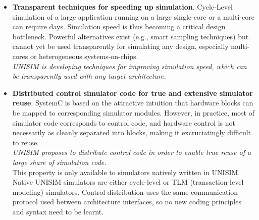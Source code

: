 \begin{itemize}
\item \textbf{Transparent techniques for speeding up simulation}. Cycle-Level simulation of a large application running on a large single-core or a multi-core can require days. Simulation speed is thus becoming a critical design bottleneck. Powerful alternatives exist (e.g., smart sampling techniques) but cannot yet be used transparently for simulating any design, especially multi-cores or heterogeneous systems-on-chips.\\
\emph{UNISIM is developing techniques for improving simulation speed, which can be transparently used with any target architecture.}
\item \textbf{Distributed control simulator code for true and extensive simulator reuse}. SystemC is based on the attractive intuition that hardware blocks can be mapped to corresponding simulator modules. However, in practice, most of simulator code corresponds to control code, and hardware control is not necessarily as cleanly separated into blocks, making it excruciatingly difficult to reuse.\\
\emph{UNISIM proposes to distribute control code in order to enable true reuse of a large share of simulation code.}\\
This property is only available to simulators natively written in UNISIM. Native UNISIM simulators are either cycle-level or TLM (transaction-level modeling) simulators. Control distribution uses the same communication protocol used between architecture interfaces, so no new coding principles and syntax need to be learnt.
\end{itemize}
